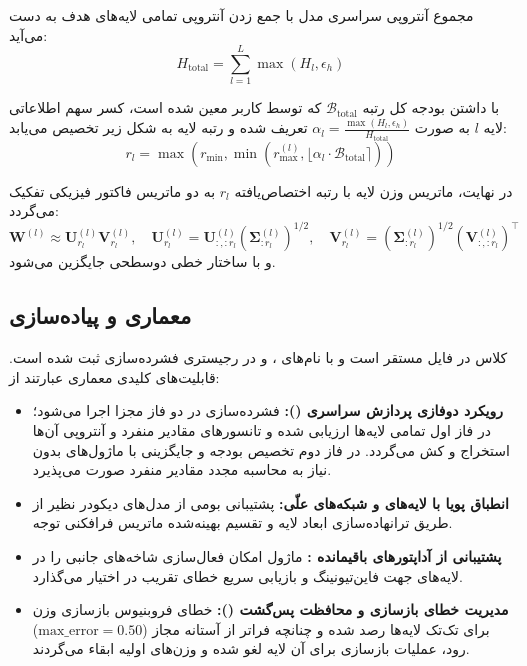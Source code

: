مجموع آنتروپی سراسری مدل با جمع زدن آنتروپی تمامی لایه‌های هدف به دست می‌آید:
\begin{equation}
H_{\text{total}} = \sum_{l=1}^L \max(H_l, \epsilon_h)
\end{equation}

با داشتن بودجه کل رتبه $\mathcal{B}_{\text{total}}$ که توسط کاربر معین شده است، کسر سهم اطلاعاتی لایه $l$ به صورت $\alpha_l = \frac{\max(H_l, \epsilon_h)}{H_{\text{total}}}$ تعریف شده و رتبه لایه به شکل زیر تخصیص می‌یابد:
\begin{equation}
r_l = \max\left(r_{\text{min}}, \min\left(r_{\text{max}}^{(l)}, \lfloor \alpha_l \cdot \mathcal{B}_{\text{total}} \rceil\right)\right)
\end{equation}

در نهایت، ماتریس وزن لایه با رتبه اختصاص‌یافته $r_l$ به دو ماتریس فاکتور فیزیکی تفکیک می‌گردد:
\begin{equation}
\mathbf{W}^{(l)} \approx \mathbf{U}_{r_l}^{(l)} \mathbf{V}_{r_l}^{(l)}, \quad \mathbf{U}_{r_l}^{(l)} = \mathbf{U}_{:, :r_l}^{(l)} (\mathbf{\Sigma}_{:r_l}^{(l)})^{1/2}, \quad \mathbf{V}_{r_l}^{(l)} = (\mathbf{\Sigma}_{:r_l}^{(l)})^{1/2} (\mathbf{V}_{:, :r_l}^{(l)})^\top
\end{equation}
و با ساختار خطی دوسطحی  جایگزین می‌شود.

\subsection{معماری و پیاده‌سازی}
کلاس  در فایل  مستقر است و با نام‌های ،  و  در رجیستری فشرده‌سازی ثبت شده است. قابلیت‌های کلیدی معماری عبارتند از:
\begin{itemize}
    \item \textbf{رویکرد دوفازی پردازش سراسری ():} فشرده‌سازی در دو فاز مجزا اجرا می‌شود؛ در فاز اول تمامی لایه‌ها ارزیابی شده و تانسورهای مقادیر منفرد و آنتروپی آن‌ها استخراج و کش می‌گردد. در فاز دوم تخصیص بودجه و جایگزینی با ماژول‌های  بدون نیاز به محاسبه مجدد مقادیر منفرد صورت می‌پذیرد.
    \item \textbf{انطباق پویا با لایه‌های  و شبکه‌های علّی:} پشتیبانی بومی از مدل‌های دیکودر نظیر  از طریق ترانهاده‌سازی ابعاد لایه  و تقسیم بهینه‌شده ماتریس فرافکنی توجه.
    \item \textbf{پشتیبانی از آداپتورهای باقیمانده :} ماژول امکان فعال‌سازی شاخه‌های  جانبی را در لایه‌های  جهت فاین‌تیونینگ و بازیابی سریع خطای تقریب در اختیار می‌گذارد.
    \item \textbf{مدیریت خطای بازسازی و محافظت پس‌گشت ():} خطای فروبنیوس بازسازی وزن برای تک‌تک لایه‌ها رصد شده و چنانچه فراتر از آستانه مجاز ($\text{max\_error}=0.50$) رود، عملیات بازسازی برای آن لایه لغو شده و وزن‌های اولیه ابقاء می‌گردند.
\end{itemize}

